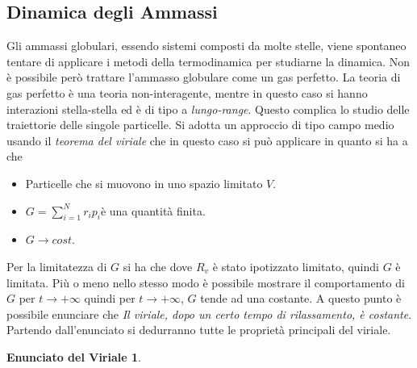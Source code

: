 \subsection{Dinamica degli Ammassi}
Gli ammassi globulari, essendo sistemi composti da molte stelle, viene spontaneo tentare di applicare i metodi della termodinamica per studiarne la dinamica. Non \`e possibile per\`o trattare l'ammasso globulare come un gas perfetto. La teoria di gas perfetto \`e una teoria non-interagente, mentre in questo caso si hanno interazioni stella-stella ed \`e di tipo a \emph{lungo-range}. Questo complica lo studio delle traiettorie delle singole particelle. Si adotta un approccio di tipo campo medio usando il \emph{teorema del viriale} che in questo caso si pu\`o applicare in quanto si ha a che
\begin{itemize}
	\item Particelle che si muovono in uno spazio limitato $V$.
	\item $G=\sum_{i=1}^Nr_ip_i$\`e una quantit\`a finita. 
	\item $G\to cost$.
\end{itemize}

Per la limitatezza di $G$ si ha che 
dove $R_v$ \`e stato ipotizzato limitato, quindi $G$ \`e limitata. Pi\`u o meno nello stesso modo \`e possibile mostrare il comportamento di $G$ per $t\to+\infty$
quindi per $t\to+\infty$, $G$ tende ad una costante. A questo punto \`e possibile enunciare che \emph{Il viriale, dopo un certo tempo di rilassamento, \`e costante}. Partendo dall'enunciato si dedurranno tutte le propriet\`a principali del viriale.

\newtheorem*{mydef}{Enunciato del Viriale}
\begin{mydef}
\end{mydef}

